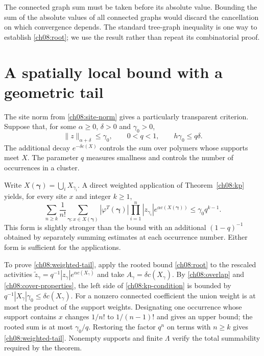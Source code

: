 The connected graph sum must be taken before its absolute value. Bounding
the sum of the absolute values of all connected graphs would discard the
cancellation on which convergence depends. The standard tree-graph
inequality is one way to establish \eqref{ch08:root}; we use the result
rather than repeat its combinatorial proof.

\section{A spatially local bound with a geometric tail}
\label{ch08:tail}

The site norm from \eqref{ch08:site-norm} gives a particularly transparent
criterion. Suppose that, for some $\alpha\ge0$, $\delta>0$ and
$\gamma_0>0$,
\begin{equation}\label{ch08:reserve}
 \|z\|_{\alpha+\delta}\le\gamma_0,
 \qquad 0<q<1,\qquad h\gamma_0\le q\delta.
\end{equation}
The additional decay $e^{-\delta c(X)}$ controls the sum over polymers
whose supports meet $X$. The parameter $q$ measures
smallness and controls the number of occurrences in a cluster.

Write $X(\boldsymbol\gamma)=\bigcup_i X_{\gamma_i}$. A direct
weighted application of Theorem~\ref{ch08:kp} yields, for every site $x$
and integer $k\ge1$,
\begin{equation}\label{ch08:weighted-tail}
 \sum_{n\ge k}\frac1{n!}
 \sum_{\boldsymbol\gamma:x\in X(\boldsymbol\gamma)}
 |\varphi^T(\boldsymbol\gamma)|
 \prod_{i=1}^n|z_{\gamma_i}|
 e^{\alpha c(X(\boldsymbol\gamma))}
 \le\gamma_0 q^{k-1}.
\end{equation}
This form is slightly stronger than the bound with an additional
$(1-q)^{-1}$ obtained by separately summing estimates at each occurrence
number. Either form is sufficient for the applications.

To prove \eqref{ch08:weighted-tail}, apply the rooted bound
\eqref{ch08:root} to the rescaled activities
$\widetilde z_\gamma=q^{-1}|z_\gamma|e^{\alpha c(X_\gamma)}$
and take $A_\gamma=\delta c(X_\gamma)$. By
\eqref{ch08:overlap} and \eqref{ch08:cover-properties}, the left side of
\eqref{ch08:kp-condition} is bounded by
$q^{-1}|X_\gamma|\gamma_0\le\delta c(X_\gamma)$.
For a nonzero connected coefficient the union weight is at most the
product of the support weights. Designating one occurrence whose support
contains $x$ changes $1/n!$ to $1/(n-1)!$ and gives an upper bound;
the rooted sum is at most $\gamma_0/q$. Restoring the factor $q^n$
on terms with $n\ge k$ gives \eqref{ch08:weighted-tail}. Nonempty supports
and finite $\Lambda$ verify the total summability required by the theorem.


